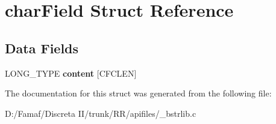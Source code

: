 \hypertarget{structchar_field}{\section{char\+Field Struct Reference}
\label{structchar_field}
}
\subsection*{Data Fields}
\begin{DoxyCompactItemize}
\item 
\hypertarget{structchar_field_ade519a8c96fe6175e81b5cad49371a6e}{L\+O\+N\+G\+\_\+\+T\+Y\+P\+E {\bfseries content} \mbox{[}C\+F\+C\+L\+E\+N\mbox{]}}\label{structchar_field_ade519a8c96fe6175e81b5cad49371a6e}

\end{DoxyCompactItemize}


The documentation for this struct was generated from the following file\+:\begin{DoxyCompactItemize}
\item 
D\+:/\+Famaf/\+Discreta I\+I/trunk/\+R\+R/apifiles/\+\_\+bstrlib.\+c\end{DoxyCompactItemize}
